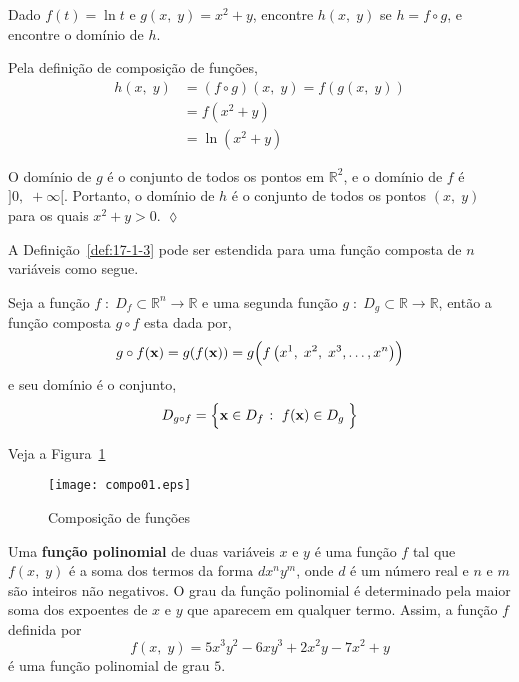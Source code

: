 \begin{exer}
	Dado \(f(t) = \ln t\) e \(g(x,\; y) = x^{2}+y\), encontre \(h(x,\; y)\) se \(h = f\circ g\), e encontre o domínio de \(h\).
\end{exer}

\solo
Pela definição de composição de funções,
\begin{align*}
	h(x,\; y) & = (f\circ g)(x,\; y) = f(g(x,\; y))\\[2ex]
	&= f(x^{2}+y)\\[2ex]
	& = \ln\left(x^{2}+y\right)
\end{align*}

O domínio de \(g\) é o conjunto de todos os pontos em \(\mathbb{R}^{2}\), e o domínio de \(f\) é \(]0,\; +\infty[\). Portanto, o domínio de \(h\) é o 
conjunto de todos os pontos \((x,\; y)\) para os quais \(x^{2}+y>0\). \hfill \(\lozenge\)

A Definição~\ref{def:17-1-3} pode ser estendida para uma função composta de \(n\) variáveis como segue.

\begin{defi}
	Seja a função $f\; \colon\;  D_{f}\subset \mathbb{R}^n\to \mathbb{R}$ e uma segunda função $g \; \colon\; D_{g}\subset \mathbb{R}\to \mathbb{R}$, então a função composta $g\circ f$ esta dada por,
	\begin{equation*}
		g\circ f(\mathbf{x})=g(f(\mathbf{x}))=g\Bigl(f\left(x^{1}, \; x^{2},\; x^{3},\ldots,x^{n}\right)\Bigr)
	\end{equation*}
	e seu domínio é o conjunto,
	\begin{equation*}
		D_{g\circ f}=\Bigl\{\mathbf{x}\in D_{f} \; \colon\;  f(\mathbf{x})\in D_{g}\;\Bigr\}
	\end{equation*}
\end{defi}
Veja a Figura~\ref{comp_01}
%
\begin{figure}[H]
	\centering
	\texttt{[image: compo01.eps]}
	\caption{Composição de funções}
	\label{comp_01}
\end{figure}
%

Uma \textbf{função polinomial} de duas variáveis \(x\) e \(y\) é uma função \(f\) tal que \(f(x,\; y)\) é a soma dos termos da forma \(dx^{n}y^{m}\), onde 
\(d\) é um número real e \(n\) e \(m\) são inteiros não negativos. O grau da função polinomial é determinado pela maior soma dos expoentes de \(x\) e 
\(y\) que aparecem em qualquer termo. Assim, a função \(f\) definida por
\begin{equation*}
	f(x,\; y) = 5x^{3}y^{2}-6xy^{3} +2x^{2}y-7x^{2} + y
\end{equation*}
é uma função polinomial de grau \(5\).

